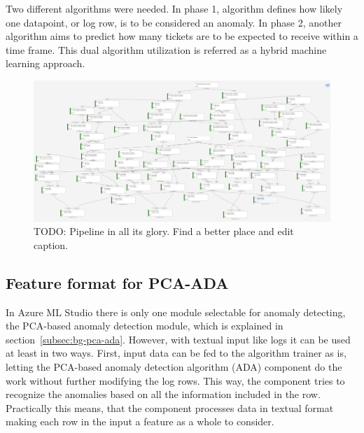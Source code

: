 Two different algorithms were needed.
In phase 1,
algorithm defines how likely one datapoint, or log row,
is to be considered an anomaly.
In phase 2,
another algorithm aims to predict
how many tickets are to be expected to receive
within a time frame.
This dual algorithm utilization is referred as a hybrid machine learning approach.~\cite{tsai2010credit}



\begin{figure}[htb]
    \centering
    \includegraphics[width=150mm]{./appendices/pipeline-draft}
    \caption{TODO: Pipeline in all its glory. Find a better place and edit caption.
    \label{fig:pipeline draft}}
\end{figure}



\subsection{Feature format for PCA-ADA}\label{subsec:pipe-pca-ada-feature-format}

In Azure ML Studio
there is only one module selectable
for anomaly detecting,
the PCA-based anomaly detection module,
which is explained in section~\ref{subsec:bg-pca-ada}.
However,
with textual input like logs
it can be used at least in two ways.
First,
input data can be fed to
the algorithm trainer as is,
letting the PCA-based anomaly detection algorithm (ADA) component
do the work without further modifying the log rows.
This way,
the component tries to recognize the anomalies
based on all the information included in the row.
Practically this means,
that the component processes data in textual format
making each row in the input
a feature as a whole
to consider.

